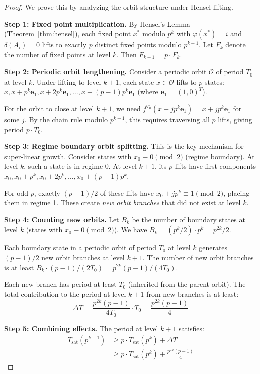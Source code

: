 \documentclass[11pt]{article}
\theoremstyle{plain}
\theoremstyle{definition}
\begin{document}
\begin{proof}
We prove this by analyzing the orbit structure under Hensel lifting.

\textbf{Step 1: Fixed point multiplication.} By Hensel's Lemma (Theorem~\ref{thm:hensel}), each fixed point $x^*$ modulo $p^k$ with $\varphi(x^*) = i$ and $\delta(A_i) = 0$ lifts to exactly $p$ distinct fixed points modulo $p^{k+1}$. Let $F_k$ denote the number of fixed points at level $k$. Then $F_{k+1} = p \cdot F_k$.

\textbf{Step 2: Periodic orbit lengthening.} Consider a periodic orbit $\mathcal{O}$ of period $T_0$ at level $k$. Under lifting to level $k+1$, each state $x \in \mathcal{O}$ lifts to $p$ states: $x, x + p^k \mathbf{e}_1, x + 2p^k \mathbf{e}_1, \ldots, x + (p-1)p^k \mathbf{e}_1$ (where $\mathbf{e}_1 = (1,0)^T$). 

For the orbit to close at level $k+1$, we need $f^{T_0}(x + jp^k \mathbf{e}_1) = x + jp^k \mathbf{e}_1$ for some $j$. By the chain rule modulo $p^{k+1}$, this requires traversing all $p$ lifts, giving period $p \cdot T_0$.

\textbf{Step 3: Regime boundary orbit splitting.} This is the key mechanism for super-linear growth. Consider states with $x_0 \equiv 0 \pmod{2}$ (regime boundary). At level $k$, such a state is in regime 0. At level $k+1$, its $p$ lifts have first components $x_0, x_0 + p^k, x_0 + 2p^k, \ldots, x_0 + (p-1)p^k$.

For odd $p$, exactly $(p-1)/2$ of these lifts have $x_0 + jp^k \equiv 1 \pmod{2}$, placing them in regime 1. These create \emph{new orbit branches} that did not exist at level $k$.

\textbf{Step 4: Counting new orbits.} Let $B_k$ be the number of boundary states at level $k$ (states with $x_0 \equiv 0 \pmod{2}$). We have $B_k = (p^k / 2) \cdot p^k = p^{2k}/2$.

Each boundary state in a periodic orbit of period $T_0$ at level $k$ generates $(p-1)/2$ new orbit branches at level $k+1$. The number of new orbit branches is at least $B_k \cdot (p-1)/(2T_0) = p^{2k}(p-1)/(4T_0)$.

Each new branch has period at least $T_0$ (inherited from the parent orbit). The total contribution to the period at level $k+1$ from new branches is at least:
\begin{equation}
\Delta T = \frac{p^{2k}(p-1)}{4T_0} \cdot T_0 = \frac{p^{2k}(p-1)}{4}
\end{equation}

\textbf{Step 5: Combining effects.} The period at level $k+1$ satisfies:
\begin{align}
T_{\mathrm{sat}}(p^{k+1}) &\geq p \cdot T_{\mathrm{sat}}(p^k) + \Delta T \\
&\geq p \cdot T_{\mathrm{sat}}(p^k) + \frac{p^{2k}(p-1)}{4}
\end{align}


\end{proof}
\end{document}
